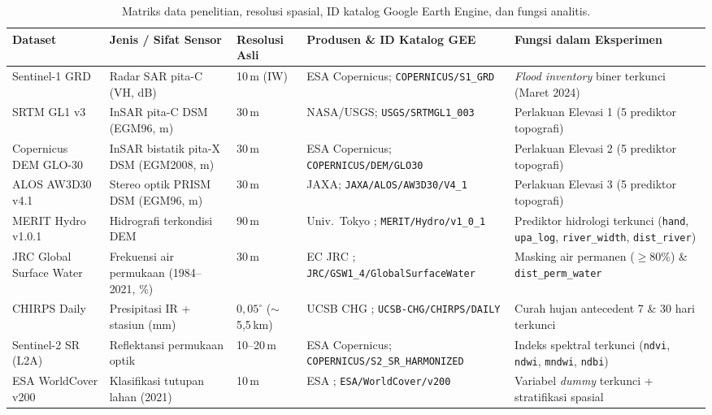 \documentclass[11pt,twoside]{article}
\begin{document}
\begin{table}[!htbp]
\small
\centering
\caption{Matriks data penelitian, resolusi spasial, ID katalog Google Earth Engine, dan fungsi analitis.}
\label{tab:data-id}
\begin{adjustbox}{max width=\textwidth}
\begin{tabular}{>{\raggedright}p{2.7cm} >{\raggedright}p{2.8cm} >{\raggedright}p{1.6cm} >{\raggedright}p{4.3cm} >{\raggedright\arraybackslash}p{3.4cm}}
\toprule
\textbf{Dataset} & \textbf{Jenis / Sifat Sensor} & \textbf{Resolusi Asli} & \textbf{Produsen \& ID Katalog GEE} & \textbf{Fungsi dalam Eksperimen} \\
\midrule
Sentinel-1 GRD & Radar SAR pita-C (VH, dB) & 10\,m (IW) & ESA Copernicus; \texttt{COPERNICUS/\allowbreak S1\_GRD} & \textit{Flood inventory} biner terkunci (Maret 2024) \\
SRTM GL1 v3 & InSAR pita-C DSM (EGM96, m) & 30\,m & NASA/USGS; \texttt{USGS/\allowbreak SRTMGL1\_003} & Perlakuan Elevasi 1 (5 prediktor topografi) \\
Copernicus DEM GLO-30 & InSAR bistatik pita-X DSM (EGM2008, m) & 30\,m & ESA Copernicus; \texttt{COPERNICUS/\allowbreak DEM/\allowbreak GLO30} & Perlakuan Elevasi 2 (5 prediktor topografi) \\
ALOS AW3D30 v4.1 & Stereo optik PRISM DSM (EGM96, m) & 30\,m & JAXA; \texttt{JAXA/\allowbreak ALOS/\allowbreak AW3D30/\allowbreak V4\_1} & Perlakuan Elevasi 3 (5 prediktor topografi) \\
MERIT Hydro v1.0.1 & Hidrografi terkondisi DEM & 90\,m & Univ.\ Tokyo \cite{yamazaki2019}; \texttt{MERIT/\allowbreak Hydro/\allowbreak v1\_0\_1} & Prediktor hidrologi terkunci (\texttt{hand}, \texttt{upa\_log}, \texttt{river\_width}, \texttt{dist\_river}) \\
JRC Global Surface Water & Frekuensi air permukaan (1984--2021, \%) & 30\,m & EC JRC \cite{pekel2016}; \texttt{JRC/\allowbreak GSW1\_4/\allowbreak Global\allowbreak SurfaceWater} & Masking air permanen ($\ge 80\%$) \& \texttt{dist\_perm\_water} \\
CHIRPS Daily & Presipitasi IR + stasiun (mm) & $0{,}05^\circ$ ($\sim$5,5\,km) & UCSB CHG \cite{funk2015}; \texttt{UCSB-CHG/\allowbreak CHIRPS/\allowbreak DAILY} & Curah hujan antecedent 7 \& 30 hari terkunci \\
Sentinel-2 SR (L2A) & Reflektansi permukaan optik & 10--20\,m & ESA Copernicus; \texttt{COPERNICUS/\allowbreak S2\_SR\_\allowbreak HARMONIZED} & Indeks spektral terkunci (\texttt{ndvi}, \texttt{ndwi}, \texttt{mndwi}, \texttt{ndbi}) \\
ESA WorldCover v200 & Klasifikasi tutupan lahan (2021) & 10\,m & ESA \cite{zanaga2021}; \texttt{ESA/\allowbreak WorldCover/\allowbreak v200} & Variabel \textit{dummy} terkunci + stratifikasi spasial \\
\bottomrule
\end{tabular}
\end{adjustbox}
\end{table}
\end{document}
